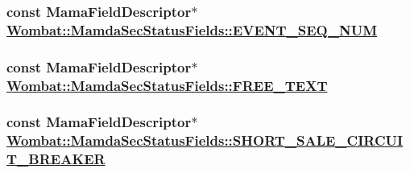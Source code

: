 \hypertarget{classWombat_1_1MamdaSecStatusFields_1f28d36c8607d7892514042b9038ca7a}{
\subsubsection[EVENT\_\-SEQ\_\-NUM]{\setlength{\rightskip}{0pt plus 5cm}const Mama\-Field\-Descriptor$\ast$ \hyperlink{classWombat_1_1MamdaSecStatusFields_1f28d36c8607d7892514042b9038ca7a}{Wombat::Mamda\-Sec\-Status\-Fields::EVENT\_\-SEQ\_\-NUM}}}
\label{classWombat_1_1MamdaSecStatusFields_1f28d36c8607d7892514042b9038ca7a}


\hypertarget{classWombat_1_1MamdaSecStatusFields_95f43e98c060cfc9be64200ca481f55f}{
\subsubsection[FREE\_\-TEXT]{\setlength{\rightskip}{0pt plus 5cm}const Mama\-Field\-Descriptor$\ast$ \hyperlink{classWombat_1_1MamdaSecStatusFields_95f43e98c060cfc9be64200ca481f55f}{Wombat::Mamda\-Sec\-Status\-Fields::FREE\_\-TEXT}}}
\label{classWombat_1_1MamdaSecStatusFields_95f43e98c060cfc9be64200ca481f55f}


\hypertarget{classWombat_1_1MamdaSecStatusFields_4c83e286a950d8339ecb6ded8ac81973}{
\subsubsection[SHORT\_\-SALE\_\-CIRCUIT\_\-BREAKER]{\setlength{\rightskip}{0pt plus 5cm}const Mama\-Field\-Descriptor$\ast$ \hyperlink{classWombat_1_1MamdaSecStatusFields_4c83e286a950d8339ecb6ded8ac81973}{Wombat::Mamda\-Sec\-Status\-Fields::SHORT\_\-SALE\_\-CIRCUIT\_\-BREAKER}}}
\label{classWombat_1_1MamdaSecStatusFields_4c83e286a950d8339ecb6ded8ac81973}


